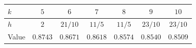 \begin{tabular}{@{}lcccccc@{}}
\toprule
$k$ & $5$ & $6$ & $7$ & $8$ & $9$ & $10$ \\
\midrule
$h$ & $2$ & $21/10$ & $11/5$ & $11/5$ & $23/10$ & $23/10$ \\
Value & $0.8743$ & $0.8671$ & $0.8618$ & $0.8574$ & $0.8540$ & $0.8509$ \\
\bottomrule
\end{tabular}
